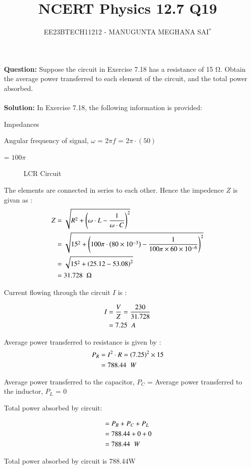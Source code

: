 \documentclass[journal,12pt,twocolumn]{IEEEtran}
\title{
	
\title{NCERT Physics 12.7 Q19}
\author{EE23BTECH11212 - MANUGUNTA MEGHANA SAI$^{*}$%
}


}
\providecommand{\brak}[1]{\ensuremath{\left(#1\right)}}
\theoremstyle{remark}
\begin{document}
\maketitle

\textbf{Question:} 
Suppose the circuit in Exercise 7.18 has a resistance of 15 Ω. Obtain the average power transferred to each element of the circuit, and the total power absorbed.\\
\\
     
\textbf{Solution: }
In Exercise 7.18, the following information is provided:
 
 

 \begin{table}[h]
 	\centering
 	\resizebox{6 cm}{!}{
 		
 	}
 	\vspace{6 pt}
 	\caption{Impedances}
 	\label{tab:my_label} 
 \end{table}
 

Angular frequency of signal, $\omega$ = 2$\pi$$f$ = 2$\pi \cdot \left(50\right)$ 

= $100\pi$
 
 \begin{figure}[h]
 	\centering
 	
 	\caption{LCR Circuit}
 	\label{fig:2}
 \end{figure}
 
 The elements are connected in series to each other. Hence the impedence $Z$ is givan as :
 \
 \begin{align}
 Z &= \sqrt{R^2 + \left(\omega\cdot L - \frac{1}{\omega\cdot C}\right)^2}
 \\&= \sqrt{15^2 + \left(100\pi\cdot\brak{80 \times 10^{-3}} - \frac{1}{100\pi \times 60 \times 10^{-6}}\right)^2}
 \\&= \sqrt{15^2 + \left(25.12 - 53.08\right)^2}
 \\&=31.728\hspace{0.2cm}\ohm
\end{align}	



Current flowing through the circuit $I$ is :

\begin{align}
	I&=\frac{V}{Z}=\frac{230}{31.728}
	\\&=7.25\hspace{0.2cm}A
\end{align}

Average power transferred to resistance is given by :
\begin{align}
	P_R &= I^2\cdot R = \brak{7.25}^2 \times 15
	\\&=788.44\hspace{0.2cm}W
\end{align}

Average power transferred to the capacitor, $P_C$ = Average power transferred to the inductor, $P_L$ = 0

Total power absorbed by circuit:

\begin{align}
	&= P_R + P_C + P_L
	\\&= 788.44 + 0 + 0
	\\&= 788.44\hspace{0.2cm}W
\end{align}

Total power absorbed by circuit is 788.44\hspace{0.01cm}W
 
\end{document}
